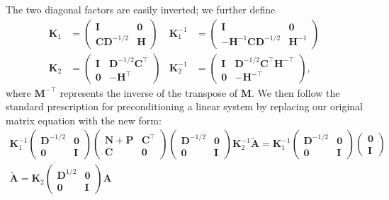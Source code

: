 The two diagonal factors are easily inverted; we further define
\begin{subequations}\begin{align}
\mathbf{K}_1 &=
\begin{pmatrix}
\mathbf{I} & \mathbf{0}\\
\mathbf{C} \mathbf{D}^{-1/2} & \mathbf{H}
\end{pmatrix}
&
\mathbf{K}_1^{-1} &=
\begin{pmatrix}
\mathbf{I} & \mathbf{0}\\
-\mathbf{H}^{-1}\mathbf{CD}^{-1/2} & \mathbf{H}^{-1}
\end{pmatrix}\\
\mathbf{K}_2 &=
\begin{pmatrix}
\mathbf{I} & \mathbf{D}^{-1/2}\mathbf{C}^\top\\
\mathbf{0} & -\mathbf{H}^\top
\end{pmatrix}
&
\mathbf{K}_2^{-1} &=
\begin{pmatrix}
\mathbf{I} & \mathbf{D}^{-1/2}\mathbf{C}^\top \mathbf{H}^{-\top}\\
\mathbf{0} & -\mathbf{H}^{-\top}
\end{pmatrix},
\end{align}\end{subequations}
where $\mathbf{M}^{-\top}$ represents the inverse of the transpose of $\mathbf{M}$.  We then follow the standard prescription for preconditioning a linear system by replacing our original matrix equation with the new form:
\begin{subequations}\begin{gather}
\mathbf{K}_1^{-1} \begin{pmatrix}\mathbf{D}^{-1/2}&\mathbf{0}\\ \mathbf{0}&\mathbf{I}\end{pmatrix}
\begin{pmatrix}
\mathbf{N}+\mathbf{P} & \mathbf{C}^\top \\
\mathbf{C} & \mathbf{0}
\end{pmatrix}
\begin{pmatrix}\mathbf{D}^{-1/2}&\mathbf{0}\\ \mathbf{0}&\mathbf{I}\end{pmatrix} \mathbf{K}_2^{-1} \mathbf{\widetilde{A}} = 
\mathbf{K}_1^{-1} \begin{pmatrix}\mathbf{D}^{-1/2}&\mathbf{0}\\\mathbf{0}&\mathbf{I}\end{pmatrix} \begin{pmatrix}\mathbf{0}\\ \mathbf{I}\end{pmatrix}\\
\mathbf{\widetilde{A}} = \mathbf{K}_2 \begin{pmatrix}\mathbf{D}^{1/2} & \mathbf{0}\\ \mathbf{0} & \mathbf{I}\end{pmatrix}\mathbf{A}
\end{gather}\end{subequations}
